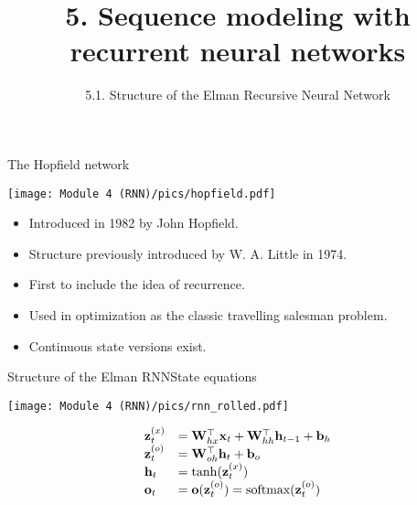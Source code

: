 \documentclass{beamer}
\title{5. Sequence modeling with recurrent neural networks}
\subtitle{5.1. Structure of the Elman Recursive Neural Network}
\begin{document}
\maketitle
\begin{frame}{The Hopfield network}
\begin{multicols}{2}
\begin{center}
    \texttt{[image: Module 4 (RNN)/pics/hopfield.pdf]}
\end{center}

\columnbreak

\begin{itemize}
    \item Introduced in 1982 by John Hopfield. 
    \item Structure previously introduced by W. A. Little in 1974.
    \item First to include the idea of recurrence. 
    \item Used in optimization as the classic travelling salesman problem. 
    \item Continuous state versions exist.
\end{itemize}

\end{multicols}

\end{frame}
\begin{frame}{Structure of the Elman RNN}{State equations}
\begin{center}
    \texttt{[image: Module 4 (RNN)/pics/rnn\_rolled.pdf]}
    \end{center}

\begin{equation}\label{eq:RNN_recursion} 
\begin{array}{ll}
{\bf z}^{(x)}_{t}&={\bf W}_{hx}^\top{\bf x}_{t} + {\bf W}_{hh}^\top{\bf h}_{t-1}+{\bf b}_{h} \\
{\bf z}^{(o)}_{t}&={\bf W}_{oh}^\top{\bf h}_{t} +{\bf b}_{o}\\
{\bf h}_{t}&=\tanh({\bf z}^{(x)}_{t})\\
{{\bf o}_{t}}&={\bf o}({\bf z}^{(o)}_t)=\text{softmax}({\bf z}^{(o)}_{t})
\end{array}
\end{equation}
\end{frame}
\end{document}
